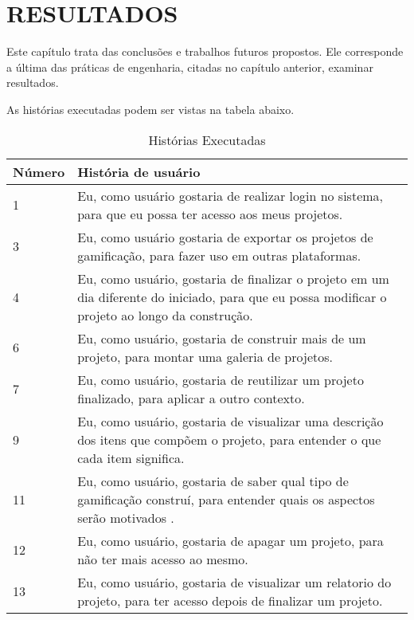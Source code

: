 \chapter[Resultados]{RESULTADOS}

Este capítulo trata das conclusões e trabalhos futuros propostos. Ele corresponde a última das práticas de engenharia, citadas no capítulo anterior, examinar resultados.

As histórias executadas podem ser vistas na tabela abaixo.

\begin{table}[!htpb]
\centering
\begin{tabular}{|p{1.5cm}|p{12cm}|} \hline

 Número & História de usuário \\ \hline

 1 & Eu, como usuário gostaria de realizar login no sistema, para que eu possa ter acesso aos meus projetos. \\ \hline

 3 & Eu, como usuário gostaria  de exportar os projetos de gamificação, para fazer uso em outras plataformas. \\ \hline

 4 & Eu, como usuário, gostaria de finalizar o projeto em um dia diferente do iniciado, para que eu possa modificar o projeto ao longo da construção. \\ \hline

 6 & Eu, como usuário, gostaria de construir mais de um projeto, para montar uma galeria de projetos. \\ \hline

 7 & Eu, como usuário, gostaria de reutilizar um projeto finalizado, para aplicar a outro contexto. \\ \hline

 9 & Eu, como usuário, gostaria de visualizar uma descrição dos itens que compõem o projeto, para entender o que cada item significa. \\ \hline

 11 & Eu, como usuário, gostaria de saber qual tipo de gamificação construí, para entender quais os aspectos serão motivados . \\ \hline

 12 & Eu, como usuário, gostaria de apagar um projeto, para não ter mais acesso ao mesmo. \\ \hline

 13 & Eu, como usuário, gostaria de visualizar um relatorio do projeto, para ter acesso depois de finalizar um projeto. \\ \hline


\end{tabular}
\caption{Histórias Executadas\label{feitas}
}
\end{table} 

